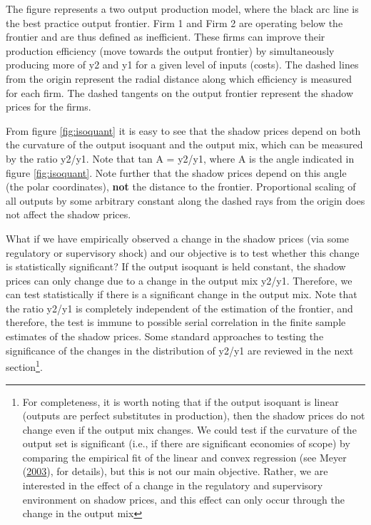 \documentclass[12pt,]{article}
\begin{document}
\begin{footnotesize} 
The figure represents a two output production model, where the black arc line is the best practice output frontier. Firm 1 and Firm 2 are operating below the frontier and are thus defined as inefficient. These firms can improve their production efficiency (move towards the output frontier) by simultaneously producing more of y2 and y1 for a given level of inputs (costs). The dashed lines from the origin represent the radial distance along which efficiency is measured for each firm.  The dashed tangents on the output frontier represent the shadow prices for the firms.
\end{footnotesize}

From figure \ref{fig:isoquant} it is easy to see that the shadow prices depend on both the curvature of the output isoquant and the output mix, which can be measured by the ratio y2/y1. Note that tan A = y2/y1, where A is the angle indicated in figure \ref{fig:isoquant}. Note further that the shadow prices depend on this angle (the polar coordinates), \textbf{not} the distance to the frontier. Proportional scaling of all outputs by some arbitrary constant along the dashed rays from the origin does not affect the shadow prices.

What if we have empirically observed a change in the shadow prices (via some regulatory or supervisory shock) and our objective is to test whether this change is statistically significant? If the output isoquant is held constant, the shadow prices can only change due to a change in the output mix y2/y1. Therefore, we can test statistically if there is a significant change in the output mix. Note that the ratio y2/y1 is completely independent of the estimation of the frontier, and therefore, the test is immune to possible serial correlation in the finite sample estimates of the shadow prices. Some standard approaches to testing the significance of the changes in the distribution of y2/y1 are reviewed in the next section\footnote{For completeness, it is worth noting that if the output isoquant is linear (outputs are perfect substitutes in production), then the shadow prices do not change even if the output mix changes. We could test if the curvature of the output set is significant (i.e., if there are significant economies of scope) by comparing the empirical fit of the linear and convex regression (see Meyer (\protect\hyperlink{ref-Meyer2003}{2003}), for details), but this is not our main objective. Rather, we are interested in the effect of a change in the regulatory and supervisory environment on shadow prices, and this effect can only occur through the change in the output mix}.
\end{document}
